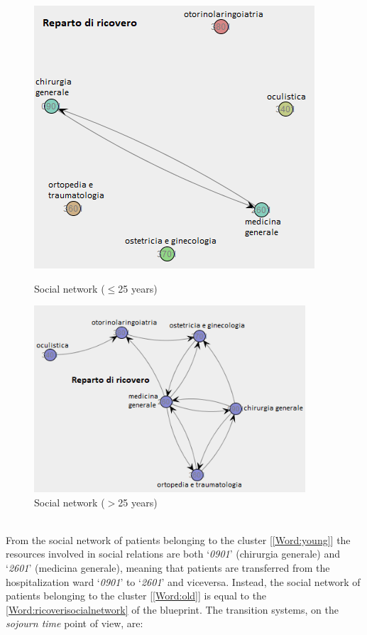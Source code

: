 \begin{figure} [htbp]
\begin{minipage}[t]{0.4\textwidth}
\includegraphics[width=\textwidth]{RicoveriSocialNetworkYoungs}
\caption{Social network ($\leq$25 years)}
\end{minipage}
\begin{minipage}[t]{0.6\textwidth}
\includegraphics[width=0.9\textwidth]{RicoveriSocialNetworkOlds}
\caption{Social network ($>$25 years)}
\end{minipage}
\end{figure}\\
From the social network of patients belonging to the cluster [\ref{Word:young}] the resources involved in social relations are both `\textit{0901}' (chirurgia generale) and `\textit{2601}' (medicina generale), meaning that patients are transferred from the hospitalization ward `\textit{0901}' to `\textit{2601}' and viceversa. Instead, the social network of patients belonging to the cluster [\ref{Word:old}] is equal to the \ref{Word:ricoverisocialnetwork} of the blueprint. The transition systems, on the \textit{sojourn time} point of view, are:
